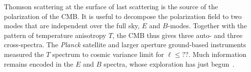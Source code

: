 Thomson scattering at the surface of last scattering is the source of the polarization of the \ac{CMB}. It is useful 
to decompose the polarization field to two modes that are independent over the full sky, $E$ and $B$-modes. 
Together with the pattern of temperature anisotropy $T$, the \ac{CMB} thus gives three auto- and three cross-spectra. 
The {\it Planck} satellite and larger aperture ground-based instruments measured the $T$ spectrum to cosmic
variance limit for $\ell \leq ??$. Much information remains encoded in the $E$ and $B$ spectra, whose exploration 
has just begun~\cite{planck,spt,polarbear,bicep}.   

